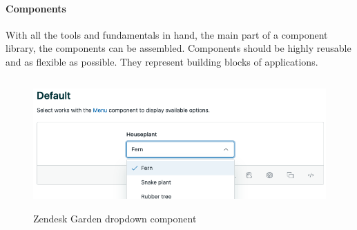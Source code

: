 \paragraph{Components}
With all the tools and fundamentals in hand, the main part of a component library, the components can be assembled. Components should be highly reusable and as flexible as possible. They represent building blocks of applications.  \\
\begin{figure}[hbtp]
	\centerline{\includegraphics[height=5cm]{images/zendesk_component_example.png}}
	\caption{Zendesk Garden dropdown component \cite{zendesk_garden_zendesk_nodate}}
	\label{zen_garden_component}
\end{figure}

